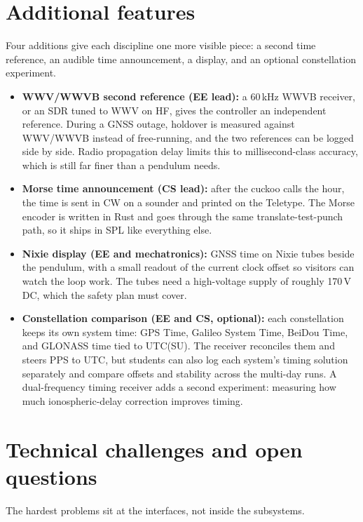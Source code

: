 \documentclass[11pt,letterpaper]{article}
\newcommand{\lead}[1]{\textbf{#1}}
\begin{document}
\section{Additional features}

Four additions give each discipline one more visible piece: a second time reference, an
audible time announcement, a display, and an optional constellation experiment.

\begin{itemize}
  \item \lead{WWV/WWVB second reference (EE lead):} a 60\,kHz WWVB receiver, or an SDR tuned
    to WWV on HF, gives the controller an independent reference. During a GNSS outage,
    holdover is measured against WWV/WWVB instead of free-running, and the two references can
    be logged side by side. Radio propagation delay limits this to millisecond-class accuracy,
    which is still far finer than a pendulum needs.
  \item \lead{Morse time announcement (CS lead):} after the cuckoo calls the hour, the time is
    sent in CW on a sounder and printed on the Teletype. The Morse encoder is written in Rust
    and goes through the same translate-test-punch path, so it ships in SPL like everything
    else.
  \item \lead{Nixie display (EE and mechatronics):} GNSS time on Nixie tubes beside the
    pendulum, with a small readout of the current clock offset so visitors can watch the loop
    work. The tubes need a high-voltage supply of roughly 170\,V\,DC, which the safety plan
    must cover.
  \item \lead{Constellation comparison (EE and CS, optional):} each constellation keeps its
    own system time: GPS Time, Galileo System Time, BeiDou Time, and GLONASS time tied to
    UTC(SU). The receiver reconciles them and steers PPS to UTC, but students can also log
    each system's timing solution separately and compare offsets and stability across the
    multi-day runs. A dual-frequency timing receiver adds a second experiment: measuring how
    much ionospheric-delay correction improves timing.
\end{itemize}

\section{Technical challenges and open questions}

The hardest problems sit at the interfaces, not inside the subsystems.
\end{document}
